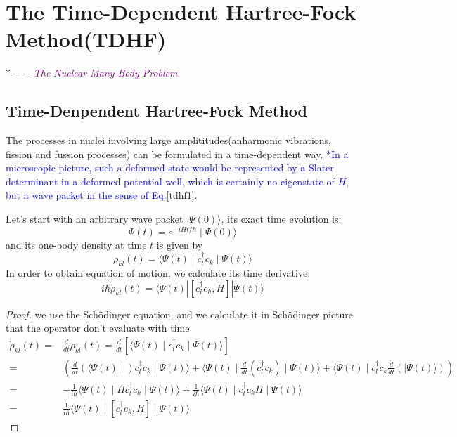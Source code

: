 \chapter{The Time-Dependent Hartree-Fock Method(TDHF)}

  $\ast -- $ \textcolor{purple}{\textit{The Nuclear Many-Body Problem}}

  \section{Time-Denpendent Hartree-Fock Method}
  The processes in nuclei involving large amplititudes(anharmonic vibrations, fission and fussion processes) can be formulated in a time-dependent way.  \textcolor{blue}{*In a microscopic picture, such a deformed state would be represented by a Slater determinant in a deformed potential well, which is certainly no eigenstate of $H$, but a wave packet in the sense of Eq.\eqref{tdhf1}}.

  Let's start with an arbitrary wave packet $\mid\Psi(0)\rangle$, its exact time evolution is:
  \begin{equation}
    \Psi(t) = e^{-iHt/\hbar}\mid \Psi(0)\rangle \label{tdhf1} 
  \end{equation}
  and its one-body density at time $t$ is given by
  \begin{equation}
    \rho_{kl}(t) = \langle \Psi(t) \mid c_l^\dagger c_k \mid \Psi(t) \rangle  \label{tdhf2}
  \end{equation}
  In order to obtain equation of motion, we calculate its time derivative:
  \begin{equation}
    i\hbar\dot{\rho}_{kl}(t) = \langle \Psi(t) | [c_l^\dagger c_k, H] | \Psi(t) \rangle \label{tdhf3}
  \end{equation}

  \begin{proof}
    we use the Sch{\"o}dinger equation, and we calculate it in Sch{\"o}dinger picture that the operator don't evaluate with time.
    \begin{equation}
      \begin{aligned}
        \dot{\rho}_{kl}(t) =& \frac{d}{dt}\rho_{kl}(t) = \frac{d}{dt}\left[\langle \Psi(t) \mid c_l^\dagger c_k \mid \Psi(t) \rangle\right]\\
                                =& \left( \frac{d}{dt}(\langle \Psi(t) \mid) c_l^\dagger c_k \mid \Psi(t) \rangle + \langle \Psi(t) \mid \frac{d}{dt}(c_l^\dagger c_k) \mid \Psi(t) \rangle + \langle \Psi(t) \mid c_l^\dagger c_k \frac{d}{dt}(\mid \Psi(t) \rangle)\right)\\
                                =& -\frac{1}{i\hbar}\langle \Psi(t) \mid Hc_l^\dagger c_k \mid \Psi(t) \rangle + \frac{1}{i\hbar}\langle \Psi(t) \mid c_l^\dagger c_kH \mid \Psi(t) \rangle\\
                                =&\frac{1}{i\hbar}\langle \Psi(t) \mid [c_l^\dagger c_k,H] \mid \Psi(t) \rangle \label{tdhf4}
      \end{aligned}
    \end{equation}
  \end{proof}

